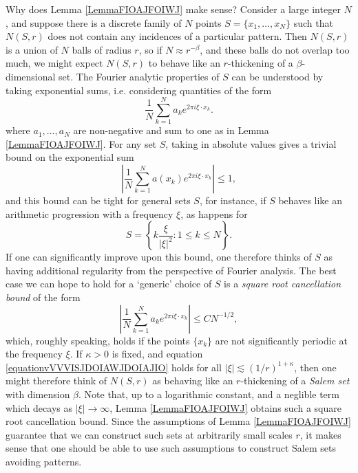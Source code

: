 \documentclass[dvipsnames,letterpaper,12pt]{article}
\numberwithin{equation}{section}
\numberwithin{theorem}{section}
\begin{document}
Why does Lemma \ref{LemmaFIOAJFOIWJ} make sense? Consider a large integer $N$, and suppose there is a discrete family of $N$ points $S = \{ x_1, \dots, x_N \}$ such that $N(S,r)$ does not contain any incidences of a particular pattern. Then $N(S,r)$ is a union of $N$ balls of radius $r$, so if $N \approx r^{-\beta}$, and these balls do not overlap too much, we might expect $N(S,r)$ to behave like an $r$-thickening of a $\beta$-dimensional set. The Fourier analytic properties of $S$ can be understood by taking exponential sums, i.e. considering quantities of the form
%
\[ \frac{1}{N} \sum_{k = 1}^N a_k e^{2 \pi i \xi \cdot x_k}. \]
%
where $a_1,\dots,a_N$ are non-negative and sum to one as in Lemma \ref{LemmaFIOAJFOIWJ}. For any set $S$, taking in absolute values gives a trivial bound on the exponential sum
%
\begin{equation}
    \left| \frac{1}{N} \sum_{k = 1}^N a(x_k) e^{2 \pi i \xi \cdot x_k} \right| \leq 1,
\end{equation}
%
and this bound can be tight for general sets $S$, for instance, if $S$ behaves like an arithmetic progression with a frequency $\xi$, as happens for
%
\[ S = \left\{ k \frac{\xi}{|\xi|^2} : 1 \leq k \leq N \right\}. \]
%
If one can significantly improve upon this bound, one therefore thinks of $S$ as having additional regularity from the perspective of Fourier analysis. The best case we can hope to hold for a `generic' choice of $S$ is a \emph{square root cancellation bound} of the form
%
\begin{equation} \label{equationvVVVISJDOIAWJDOIAJIO}
    \left| \frac{1}{N} \sum_{k = 1}^N a_k e^{2 \pi i \xi \cdot x_k} \right| \leq C N^{-1/2},
\end{equation}
%
which, roughly speaking, holds if the points $\{ x_k \}$ are not significantly periodic at the frequency $\xi$. If $\kappa > 0$ is fixed, and equation \eqref{equationvVVVISJDOIAWJDOIAJIO} holds for all $|\xi| \lesssim (1/r)^{1 + \kappa}$, then one might therefore think of $N(S,r)$ as behaving like an $r$-thickening of a \emph{Salem set} with dimension $\beta$. Note that, up to a logarithmic constant, and a neglible term which decays as $|\xi| \to \infty$, Lemma \ref{LemmaFIOAJFOIWJ} obtains such a square root cancellation bound. Since the assumptions of Lemma \ref{LemmaFIOAJFOIWJ} guarantee that we can construct such sets at arbitrarily small scales $r$, it makes sense that one should be able to use such assumptions to construct Salem sets avoiding patterns.
\end{document}
